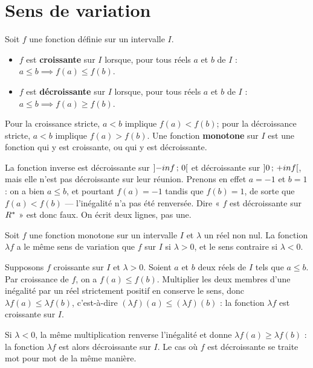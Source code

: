 \section{Sens de variation}

\begin{definition}
Soit $f$ une fonction définie sur un intervalle $I$.
\begin{itemize}[leftmargin=1.6em, itemsep=0.2em]
  \item $f$ est \textbf{croissante} sur $I$ lorsque, pour tous réels $a$ et
        $b$ de $I$ : $a \leq b \implies f(a) \leq f(b)$.
  \item $f$ est \textbf{décroissante} sur $I$ lorsque, pour tous réels $a$ et
        $b$ de $I$ : $a \leq b \implies f(a) \geq f(b)$.
\end{itemize}
Pour la croissance stricte, $a<b$ implique $f(a)<f(b)$; pour la
décroissance stricte, $a<b$ implique $f(a)>f(b)$. Une fonction \textbf{monotone} sur $I$ est une fonction
qui y est croissante, ou qui y est décroissante.
\end{definition}

\begin{remarque}
La fonction inverse est décroissante sur $\left]-inf\,;\,0\right[$ et
décroissante sur $\left]0\,;\,+inf\right[$, mais elle n'est pas décroissante
sur leur réunion. Prenons en effet $a = -1$ et $b = 1$ : on a bien
$a \leq b$, et pourtant $f(a) = -1$ tandis que $f(b) = 1$, de sorte que
$f(a) < f(b)$ — l'inégalité n'a pas été renversée. Dire « $f$ est
décroissante sur $R^{*}$ » est donc faux. On écrit deux lignes, pas une.
\end{remarque}

\begin{theoreme}
Soit $f$ une fonction monotone sur un intervalle $I$ et $\lambda$ un réel non
nul. La fonction $\lambda f$ a le même sens de variation que $f$ sur $I$ si
$\lambda > 0$, et le sens contraire si $\lambda < 0$.
\end{theoreme}

\begin{demonstration}
Supposons $f$ croissante sur $I$ et $\lambda > 0$. Soient $a$ et $b$ deux
réels de $I$ tels que $a \leq b$. Par croissance de $f$, on a
$f(a) \leq f(b)$. Multiplier les deux membres d'une inégalité par un réel
strictement positif en conserve le sens, donc
$\lambda f(a) \leq \lambda f(b)$, c'est-à-dire
$(\lambda f)(a) \leq (\lambda f)(b)$ : la fonction $\lambda f$ est croissante
sur $I$.

Si $\lambda < 0$, la même multiplication renverse l'inégalité et donne
$\lambda f(a) \geq \lambda f(b)$ : la fonction $\lambda f$ est alors
décroissante sur $I$. Le cas où $f$ est décroissante se traite mot pour mot
de la même manière.
\end{demonstration}

